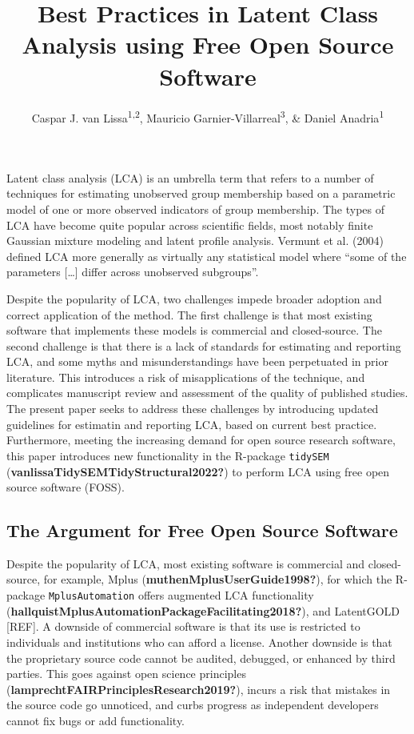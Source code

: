 \documentclass[
  ,man,floatsintext]{apa6}
\title{Best Practices in Latent Class Analysis using Free Open Source Software}
\author{Caspar J. van Lissa\textsuperscript{1,2}, Mauricio Garnier-Villarreal\textsuperscript{3}, \& Daniel Anadria\textsuperscript{1}}
\date{}
\affiliation{\vspace{0.5cm}\textsuperscript{1} Utrecht University, Methodology \& Statistics\\\textsuperscript{2} Open Science Community Utrecht\\\textsuperscript{3} Vrije Universiteit Amsterdam, Sociology}
\begin{document}
\maketitle

Latent class analysis (LCA) is an umbrella term that refers to a number
of techniques for estimating unobserved group membership based on a
parametric model of one or more observed indicators of group membership.
The types of LCA have become quite popular across scientific fields,
most notably finite Gaussian mixture modeling and latent profile
analysis. Vermunt et al. (2004) defined LCA more generally as
virtually any statistical model where ``some of the parameters {[}\ldots{]}
differ across unobserved subgroups''.

Despite the popularity of LCA,
two challenges impede broader adoption and correct application of the method.
The first challenge is that most existing software that implements these models is commercial and closed-source.
The second challenge is that there is a lack of standards for estimating and reporting LCA, and some myths and misunderstandings have been perpetuated in prior literature.
This introduces a risk of misapplications of the technique,
and complicates manuscript review and assessment of the quality of published studies.
The present paper seeks to address these challenges by introducing updated guidelines for estimatin and reporting LCA,
based on current best practice.
Furthermore, meeting the increasing demand for open source research software,
this paper introduces new functionality in the R-package \texttt{tidySEM} (\textbf{vanlissaTidySEMTidyStructural2022?}) to perform LCA using free open source software (FOSS).

\hypertarget{the-argument-for-free-open-source-software}{%
\subsection{The Argument for Free Open Source Software}\label{the-argument-for-free-open-source-software}}

Despite the popularity of LCA,
most existing software is commercial and closed-source,
for example, Mplus (\textbf{muthenMplusUserGuide1998?}), for which the R-package \texttt{MplusAutomation} offers augmented LCA functionality (\textbf{hallquistMplusAutomationPackageFacilitating2018?}), and LatentGOLD {[}REF{]}.
A downside of commercial software is that its use is restricted to individuals and institutions who can afford a license.
Another downside is that the proprietary source code cannot be audited, debugged, or enhanced by third parties.
This goes against open science principles (\textbf{lamprechtFAIRPrinciplesResearch2019?}),
incurs a risk that mistakes in the source code go unnoticed,
and curbs progress as independent developers cannot fix bugs or add functionality.
\end{document}
